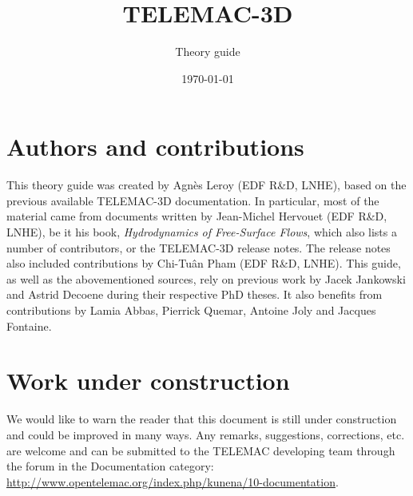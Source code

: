 \documentclass[Telemac3D]{../../data/TelemacDoc} %
\begin{document}
\let\cleardoublepage\clearpage
\title{TELEMAC-3D}
\subtitle{Theory guide}
\version{\telmaversion}
\date{\today}
\maketitle
\clearpage


\newpage

\thispagestyle{empty}

\chapter*{Authors and contributions}
This theory guide was created by Agnès Leroy (EDF R\&D, LNHE), based on the previous available TELEMAC-3D
documentation. In particular, most of the material came from documents written by Jean-Michel
Hervouet (EDF R\&D, LNHE), be it his book, \textit{Hydrodynamics of Free-Surface Flows}, which also lists a number of contributors, or the
TELEMAC-3D release notes. The release notes also included contributions by Chi-Tuân Pham (EDF R\&D, LNHE).
This guide, as well as the abovementioned sources, rely on previous work by Jacek Jankowski and Astrid Decoene during their respective PhD theses.
It also benefits from contributions by Lamia Abbas, Pierrick Quemar, Antoine Joly and Jacques Fontaine.

\newpage

\chapter*{Work under construction}\label{workunderconstruction}
We would like to warn the reader that this document is still under construction and
could be improved in many ways. Any remarks, suggestions, corrections, etc. are welcome
and can be submitted to the TELEMAC developing team through the forum in the Documentation
category: \url{http://www.opentelemac.org/index.php/kunena/10-documentation}.

\newpage
\end{document}
